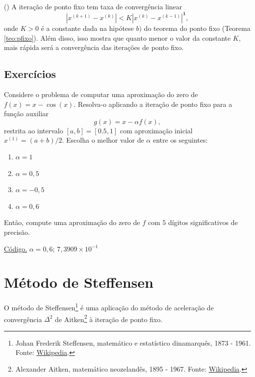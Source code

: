 \begin{obs}()
  A iteração de ponto fixo tem taxa de convergência linear
  \begin{equation}
    |x^{(k+1)} - x^{(k)}| < K|x^{(k)} - x^{(k-1)}|^{\pmb{1}},
  \end{equation}
onde $K > 0$ é a constante dada na hipótese $b)$ do teorema do ponto fixo (Teorema \ref{teo:pfixo}). Além disso, isso mostra que quanto menor o valor da constante $K$, mais rápida será a convergência das iterações de ponto fixo.
\end{obs}

\subsection*{Exercícios}

\begin{exer}\label{exer:pfixo_1}
  Considere o problema de computar uma aproximação do zero de $f(x)=x-\cos(x)$. Resolva-o aplicando a iteração de ponto fixo para a função auxiliar
  \begin{equation}
    g(x) = x - \alpha f(x),
  \end{equation}
restrita ao intervalo $[a, b] = [0.5, 1]$ com aproximação inicial $x^{(1)}=(a+b)/2$. Escolha o melhor valor de $\alpha$ entre os seguintes:
\begin{enumerate}
\item $\alpha = 1$
\item $\alpha = 0,5$
\item $\alpha = -0,5$
\item $\alpha = 0,6$
\end{enumerate}
Então, compute uma aproximação do zero de $f$ com $5$ dígitos significativos de precisão.
\end{exer}
\begin{resp}
  \ifisoctave 
  \href{https://github.com/phkonzen/notas/blob/master/src/MatematicaNumerica/cap_eq1d/dados/exer_pfixo_1/exer_pfixo_1.m}{Código.} 
  \fi
  $\alpha=0,6$; $7,3909\times 10^{-1}$
\end{resp}

\section{Método de Steffensen}\label{cap_eq1d_sec_Steffensen}

O método de Steffensen\footnote{Johan Frederik Steffensen, matemático e estatístico dinamarquês, 1873 - 1961. Fonte: \href{https://en.wikipedia.org/wiki/Johan_Frederik_Steffensen}{Wikipedia}.} é uma aplicação do método de aceleração de convergência $\Delta^2$ de Aitken\footnote{Alexander Aitken, matemático neozelandês, 1895 - 1967. Fonte: \href{https://en.wikipedia.org/wiki/Alexander_Aitken}{Wikipedia}.} à iteração de ponto fixo.

